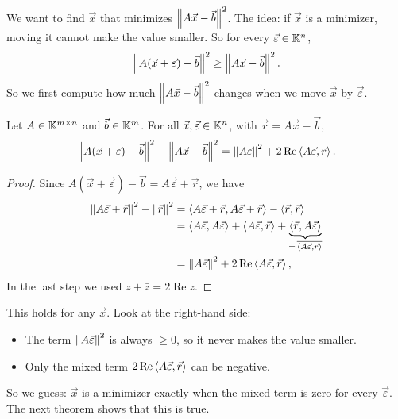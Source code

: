 We want to find $\vec{x}$ that minimizes $\left\lVert A\vec{x} - \vec{b} \right\rVert^2$. The idea: if $\vec{x}$ is a minimizer, moving it cannot make the value smaller. So for every $\vec{\varepsilon} \in \mathbb{K}^n$,
\begin{equation}
  \left\lVert A(\vec{x} + \vec{\varepsilon}) - \vec{b} \right\rVert^2 \ge \left\lVert A\vec{x} - \vec{b} \right\rVert^2.
\end{equation}
So we first compute how much $\left\lVert A\vec{x} - \vec{b} \right\rVert^2$ changes when we move $\vec{x}$ by $\vec{\varepsilon}$.

\begin{lemma}
  \label{lem:ls-expand}
  Let $A \in \mathbb{K}^{m \times n}$ and $\vec{b} \in \mathbb{K}^m$. For all $\vec{x}, \vec{\varepsilon} \in \mathbb{K}^n$, with $\vec{r} = A\vec{x} - \vec{b}$,
  \begin{equation}
    \label{eq:ls-expand}
    \left\lVert A(\vec{x} + \vec{\varepsilon}) - \vec{b} \right\rVert^2 - \left\lVert A\vec{x} - \vec{b} \right\rVert^2 = \left\lVert A\vec{\varepsilon} \right\rVert^2 + 2\operatorname{Re}\left\langle A\vec{\varepsilon}, \vec{r} \right\rangle.
  \end{equation}
\end{lemma}

\begin{proof}
  Since $A(\vec{x} + \vec{\varepsilon}) - \vec{b} = A\vec{\varepsilon} + \vec{r}$, we have
  \begin{equation}
    \begin{aligned}
      \left\lVert A\vec{\varepsilon} + \vec{r} \right\rVert^2 - \left\lVert \vec{r} \right\rVert^2
      &= \left\langle A\vec{\varepsilon} + \vec{r}, A\vec{\varepsilon} + \vec{r} \right\rangle - \left\langle \vec{r}, \vec{r} \right\rangle \\
      &= \left\langle A\vec{\varepsilon}, A\vec{\varepsilon} \right\rangle + \left\langle A\vec{\varepsilon}, \vec{r} \right\rangle + \underbrace{\left\langle \vec{r}, A\vec{\varepsilon} \right\rangle}_{=\,\overline{\left\langle A\vec{\varepsilon}, \vec{r} \right\rangle}} \\
      &= \left\lVert A\vec{\varepsilon} \right\rVert^2 + 2\operatorname{Re}\left\langle A\vec{\varepsilon}, \vec{r} \right\rangle,
    \end{aligned}
  \end{equation}
  In the last step we used $z + \bar{z} = 2\operatorname{Re}z$.
\end{proof}

This holds for any $\vec{x}$. Look at the right-hand side:
\begin{itemize}
  \item The term $\left\lVert A\vec{\varepsilon} \right\rVert^2$ is always $\ge 0$, so it never makes the value smaller.
  \item Only the mixed term $2\operatorname{Re}\left\langle A\vec{\varepsilon}, \vec{r} \right\rangle$ can be negative.
\end{itemize}
So we guess: $\vec{x}$ is a minimizer exactly when the mixed term is zero for every $\vec{\varepsilon}$. The next theorem shows that this is true.

